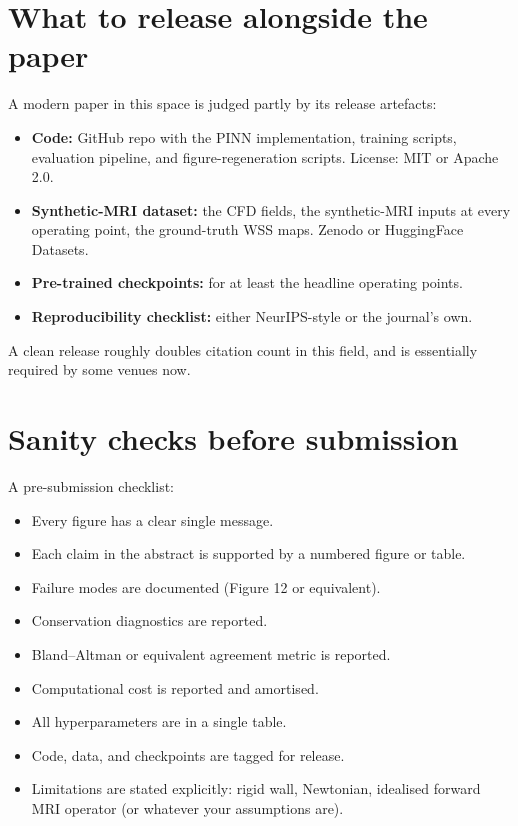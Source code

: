 \documentclass[11pt]{article}
\begin{document}
\section{What to release alongside the paper}
A modern paper in this space is judged partly by its release artefacts:
\begin{itemize}[noitemsep]
\item \textbf{Code:} GitHub repo with the PINN implementation, training scripts, evaluation pipeline, and figure-regeneration scripts. License: MIT or Apache 2.0.
\item \textbf{Synthetic-MRI dataset:} the CFD fields, the synthetic-MRI inputs at every operating point, the ground-truth WSS maps. Zenodo or HuggingFace Datasets.
\item \textbf{Pre-trained checkpoints:} for at least the headline operating points.
\item \textbf{Reproducibility checklist:} either NeurIPS-style or the journal's own.
\end{itemize}
A clean release roughly doubles citation count in this field, and is essentially required by some venues now.

\section{Sanity checks before submission}
A pre-submission checklist:
\begin{itemize}[noitemsep]
\item Every figure has a clear single message.
\item Each claim in the abstract is supported by a numbered figure or table.
\item Failure modes are documented (Figure 12 or equivalent).
\item Conservation diagnostics are reported.
\item Bland--Altman or equivalent agreement metric is reported.
\item Computational cost is reported and amortised.
\item All hyperparameters are in a single table.
\item Code, data, and checkpoints are tagged for release.
\item Limitations are stated explicitly: rigid wall, Newtonian, idealised forward MRI operator (or whatever your assumptions are).
\end{itemize}
\end{document}

